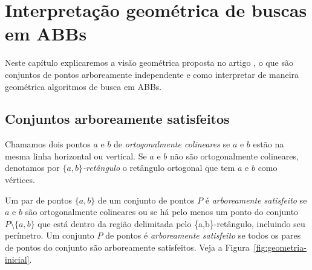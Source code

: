 
\chapter{Interpretação geométrica de buscas em ABBs}
\label{cap:geometria}

Neste capítulo explicaremos a visão geométrica proposta no artigo \cite{geometry_of_bst}, o que são conjuntos de pontos arboreamente independente e como interpretar de maneira geométrica algoritmos de busca em ABBs.

\section{Conjuntos arboreamente satisfeitos}

Chamamos dois pontos $a$ e $b$ de \textit{ortogonalmente colineares} se $a$ e $b$ estão na mesma linha horizontal ou vertical. Se $a$ e $b$ não são ortogonalmente colineares, denotamos por \textit{$\{a,b\}$-retângulo} o retângulo ortogonal que tem $a$ e $b$ como vértices.

Um par de pontos $\{a,b\}$ de um conjunto de pontos $P$ é \textit{arboreamente satisfeito} se $a$ e $b$ são ortogonalmente colineares ou se há pelo menos um ponto do conjunto \( P \setminus \{a,b\} \) que está dentro da região delimitada pelo \{a,b\}-retângulo, incluindo seu perímetro. Um conjunto $P$ de pontos é \textit{arboreamente satisfeito} se todos os pares de pontos do conjunto são arboreamente satisfeitos. Veja a Figura~\ref{fig:geometria-inicial}.

